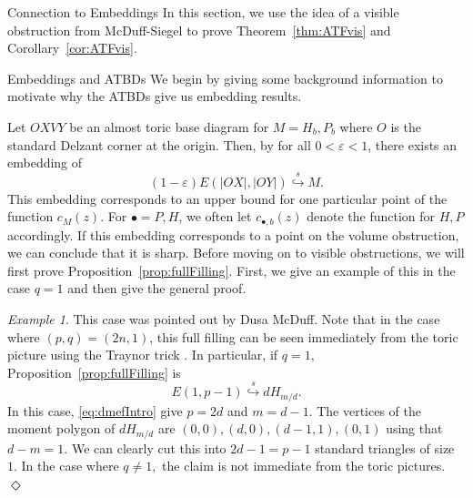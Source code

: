 \documentclass[11pt, reqno]{amsart}
\makeatletter
\def\section{\@startsection{section}{1}%
  \z@{.7\linespacing\@plus\linespacing}{.5\linespacing}%
  {\normalfont\Large\bfseries}}
\def\subsection{\@startsection{subsection}{2}%
  \z@{.5\linespacing\@plus.7\linespacing}{-.5em}%
  {\normalfont\large\bfseries}}
\theoremstyle{remark}
\numberwithin{equation}{subsection}
\numberwithin{figure}{section}
\theoremstyle{customremark}
\newtheorem{example_no_diamond}[thm]{Example}
\newenvironment{example}{\begin{example_no_diamond} } {\hfill$\er$ \end{example_no_diamond}}
\newcommand{\er}{{\Diamond}}
\newcommand{\eps}{\varepsilon}
\newcommand{\sembeds}{\stackrel{s}{\hookrightarrow}}
\makeatother
\begin{document}
\section{Connection to Embeddings}\label{ss:embed4}
In this section, we use the idea of a visible obstruction from McDuff-Siegel to prove Theorem~\ref{thm:ATFvis} and Corollary~\ref{cor:ATFvis}.

\subsection{Embeddings and ATBDs}
We begin by giving some background information to motivate why the ATBDs give us embedding results. 

Let $OXVY$ be an almost toric base diagram for $M=H_b,P_b$ where $O$ is the standard Delzant corner at the origin. Then, by \cite{AADT,CV} for all $0<\eps<1$, there exists an embedding of 
\[ (1-\eps)E(|OX|,|OY|) \sembeds M.\]
This embedding corresponds to an upper bound for one particular point of the function $c_{M}(z).$ For $\bullet=P,H$, we often let $c_{\bullet,b}(z)$ denote the function for $H,P$ accordingly. If this embedding corresponds to a point on the volume obstruction, we can conclude that it is sharp. Before moving on to visible obstructions, we will first prove Proposition~\ref{prop:fullFilling}. First, we give an example of this in the case $q=1$ and then give the general proof.
\begin{example} \label{rmk:fullFilling}
    This case was pointed out by Dusa McDuff. Note that in the case where $(p,q)=(2n,1)$, this full filling can be seen immediately from the toric picture using the Traynor trick \cite{T}. In particular, if $q=1,$ Proposition~\ref{prop:fullFilling} is 
\[ E(1,p-1) \sembeds dH_{m/d}.\]
In this case, \eqref{eq:dmefIntro} give $p=2d$ and $m=d-1.$ The vertices of the moment polygon of $dH_{m/d}$
are $(0,0),(d,0),(d-1,1),(0,1)$ using that $d-m=1.$ We can clearly cut this into $2d-1=p-1$ standard triangles of size $1.$ In the case where $q \neq 1,$ the claim is not immediate from the toric pictures. 
\end{example}
\end{document}

